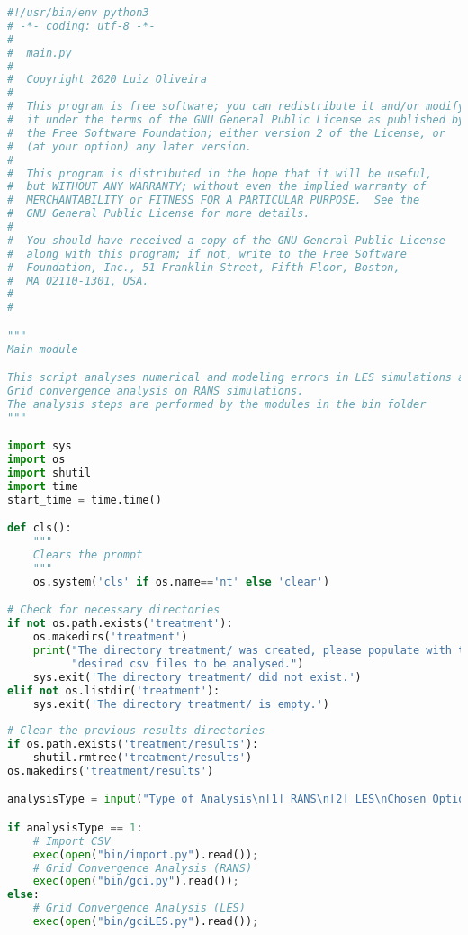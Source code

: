 \begin{lstlisting}[language=python]
#!/usr/bin/env python3
# -*- coding: utf-8 -*-
#
#  main.py
#  
#  Copyright 2020 Luiz Oliveira
#  
#  This program is free software; you can redistribute it and/or modify
#  it under the terms of the GNU General Public License as published by
#  the Free Software Foundation; either version 2 of the License, or
#  (at your option) any later version.
#  
#  This program is distributed in the hope that it will be useful,
#  but WITHOUT ANY WARRANTY; without even the implied warranty of
#  MERCHANTABILITY or FITNESS FOR A PARTICULAR PURPOSE.  See the
#  GNU General Public License for more details.
#  
#  You should have received a copy of the GNU General Public License
#  along with this program; if not, write to the Free Software
#  Foundation, Inc., 51 Franklin Street, Fifth Floor, Boston,
#  MA 02110-1301, USA.
#  
#  

"""
Main module

This script analyses numerical and modeling errors in LES simulations and
Grid convergence analysis on RANS simulations.
The analysis steps are performed by the modules in the bin folder
"""

import sys
import os
import shutil
import time
start_time = time.time()

def cls():
    """
    Clears the prompt
    """
    os.system('cls' if os.name=='nt' else 'clear')

# Check for necessary directories
if not os.path.exists('treatment'):
    os.makedirs('treatment')
    print("The directory treatment/ was created, please populate with the "
          "desired csv files to be analysed.")
    sys.exit('The directory treatment/ did not exist.')
elif not os.listdir('treatment'):
    sys.exit('The directory treatment/ is empty.')
    
# Clear the previous results directories
if os.path.exists('treatment/results'):
    shutil.rmtree('treatment/results')
os.makedirs('treatment/results')

analysisType = input("Type of Analysis\n[1] RANS\n[2] LES\nChosen Option: ")

if analysisType == 1:
    # Import CSV
    exec(open("bin/import.py").read());
    # Grid Convergence Analysis (RANS)
    exec(open("bin/gci.py").read());
else:
    # Grid Convergence Analysis (LES)
    exec(open("bin/gciLES.py").read());

\end{lstlisting}
